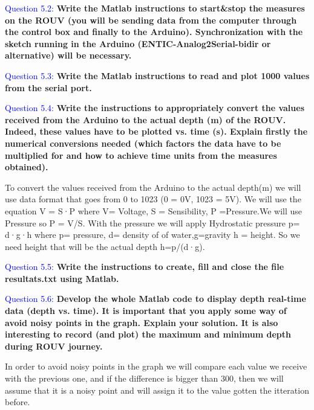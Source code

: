 \documentclass[12pt, a4papre]{article}
\begin{document}
	\textcolor{blue}{Question 5.2:} \textbf{Write the Matlab instructions to start\&stop the measures on the ROUV (you will be sending data from the computer through the control box and finally to the Arduino). Synchronization with the sketch running in the Arduino (ENTIC-Analog2Serial-bidir or alternative) will be necessary.}
	
	
	
	\textcolor{blue}{Question 5.3:} \textbf{Write the Matlab instructions to read and plot 1000 values from the serial port. }
	
		
		
	\textcolor{blue}{Question 5.4:} \textbf{Write the instructions to appropriately convert the values received from the Arduino to the actual depth (m) of the ROUV. Indeed, these values have to be plotted vs. time (s). Explain firstly the numerical conversions needed (which factors the data have to be multiplied for and how to achieve time units from the measures obtained).}
	
	To convert the values received from the Arduino to the actual depth(m) we will use data format that goes from 0 to 1023 (0 = 0V, 1023 = 5V). We will use the equation V = S·P where V= Voltage, S = Sensibility, P =Pressure.We will use Pressure so P = V/S. With the pressure we will apply Hydrostatic pressure p= d·g·h where p= pressure, d= density of of water,g=gravity  h = height. So we need height that will be the actual depth h=p/(d·g).
	
	
		
	
	\textcolor{blue}{Question 5.5:} \textbf{Write the instructions to create, fill and close the file resultats.txt using Matlab.}
		
	
	
	\textcolor{blue}{Question 5.6:} \textbf{Develop the whole Matlab code to display depth real-time data (depth vs. time). It is important that you apply some way of avoid noisy points in the graph. Explain your solution. It is also interesting to record (and plot) the maximum and minimum depth during ROUV journey.}
	
	In order to avoid noisy points in the graph we will compare each value we receive with the previous one, and if the difference is bigger than 300, then we will assume that it is a noisy point and will assign it to the value gotten the itteration before.
	
	
	
\end{document}
